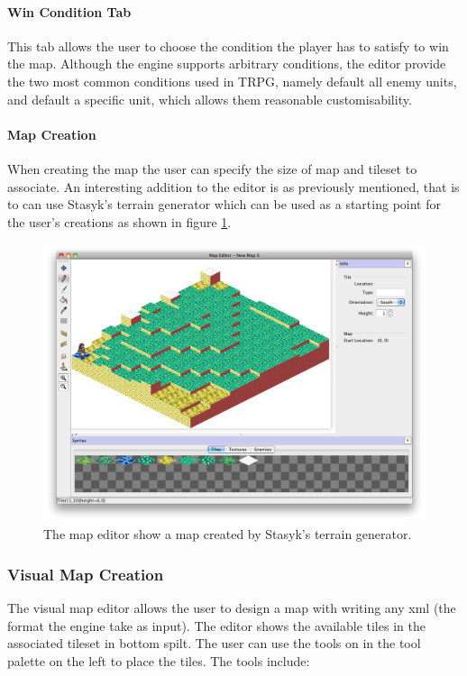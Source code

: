 \paragraph{Win Condition Tab\\}
This tab allows the user to choose the condition the player has to satisfy to win the map. Although the engine supports arbitrary conditions, the editor provide the two most common conditions used in TRPG, namely default all enemy units, and default a specific unit, which allows them  reasonable customisability.

\paragraph{Map Creation\\}
When creating the map the user can specify the size of map and tileset to associate.  An interesting addition to the editor is as previously  mentioned, that is to can use Stasyk's terrain generator which can be used as a starting point for the user's creations as shown in figure \ref{fig:figures_editor_gen}.

\begin{figure}[htb]
	\centering
		\includegraphics[width=\textwidth]{figures/editor/gen.png}
	\caption{The map editor show a map created by Stasyk's terrain generator.}
	\label{fig:figures_editor_gen}
\end{figure}

\subsubsection{Visual Map Creation}
The visual map editor allows the user to design a map with writing any xml (the format the engine take as input).  The editor shows the available tiles in the associated tileset in bottom spilt.  The user can use the tools on in the tool palette on the left to place the tiles.  The tools include:

